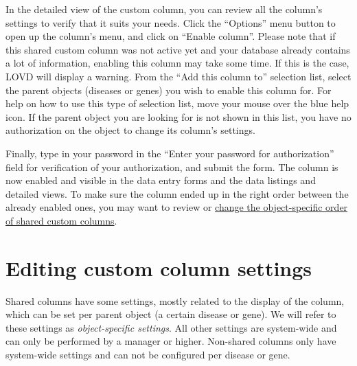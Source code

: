 \documentclass[a4paper,oneside,openany,12pt]{memoir}
\begin{document}
In the detailed view of the custom column, you can review all the column's settings to verify that it suits your needs.
Click the ``Options'' menu button to open up the column's menu, and click on ``Enable column''.
Please note that if this shared custom column was not active yet and your database already contains a lot of information, enabling this column may take some time.
If this is the case, LOVD will display a warning.
From the ``Add this column to'' selection list, select the parent objects (diseases or genes) you wish to enable this column for.
For help on how to use this type of selection list, move your mouse over the blue help icon.
If the parent object you are looking for is not shown in this list, you have no authorization on the object to change its column's settings.

Finally, type in your password in the ``Enter your password for authorization'' field for verification of your authorization, and submit the form.
The column is now enabled and visible in the data entry forms and the data listings and detailed views.
To make sure the column ended up in the right order between the already enabled ones,
 you may want to review or \hyperlink{ssec:columns_order_shared}{change the object-specific order of shared custom columns}.





\section{Editing custom column settings}
Shared columns have some settings, mostly related to the display of the column, which can be set per parent object (a certain disease or gene).
We will refer to these settings as \emph{object-specific settings}.
All other settings are system-wide and can only be performed by a manager or higher.
Non-shared columns only have system-wide settings and can not be configured per disease or gene.
\end{document}
